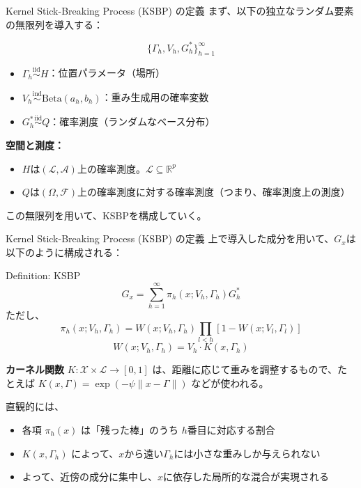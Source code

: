 \documentclass[xelatex, 8pt]{beamer}
\theoremstyle{plain}
\theoremstyle{definition}
\begin{document}
\begin{frame}{Kernel Stick-Breaking Process (KSBP) の定義}
まず、以下の独立なランダム要素の無限列を導入する：

\[
\{ \Gamma_h, V_h, G_h^* \}_{h = 1}^{\infty}
\]

\begin{itemize}
    \item $\Gamma_h \overset{\text{iid}}{\sim} H$：位置パラメータ（場所）
    \item $V_h \overset{\text{ind}}{\sim} \mathrm{Beta}(a_h, b_h)$：重み生成用の確率変数
    \item $G_h^* \overset{\text{iid}}{\sim} Q$：確率測度（ランダムなベース分布）
\end{itemize}

\vspace{1em}
\textbf{空間と測度：}
\begin{itemize}
    \item $H$は$(\mathcal{L}, \mathcal{A})$上の確率測度。$\mathcal{L} \subseteq \mathbb{R}^p$
    \item $Q$は$(\Omega, \mathcal{F})$上の確率測度に対する確率測度（つまり、確率測度上の測度）
\end{itemize}

\vspace{0.5em}
この無限列を用いて、KSBPを構成していく。
\end{frame}

\begin{frame}{Kernel Stick-Breaking Process (KSBP) の定義}
上で導入した成分を用いて、$G_x$は以下のように構成される：

\vspace{0.5em}
\begin{block}{Definition: KSBP}
\[
G_x = \sum_{h=1}^\infty \pi_h(x; V_h, \Gamma_h) G_h^*
\]
ただし、
\[
\pi_h(x; V_h, \Gamma_h) = W(x; V_h, \Gamma_h) \prod_{l < h} \left[1 - W(x; V_l, \Gamma_l)\right]
\]
\[
W(x; V_h, \Gamma_h) = V_h \cdot K(x, \Gamma_h)
\]
\end{block}

\vspace{1em}
\textbf{カーネル関数} $K : \mathcal{X} \times \mathcal{L} \rightarrow [0, 1]$ は、距離に応じて重みを調整するもので、たとえば $K(x, \Gamma) = \exp(-\psi \|x - \Gamma\|)$ などが使われる。

直観的には、
\begin{itemize}
    \item 各項 $\pi_h(x)$ は「残った棒」のうち $h$番目に対応する割合
    \item $K(x, \Gamma_h)$ によって、$x$から遠い$\Gamma_h$には小さな重みしか与えられない
    \item よって、近傍の成分に集中し、$x$に依存した局所的な混合が実現される
\end{itemize}

\end{frame}
\end{document}
